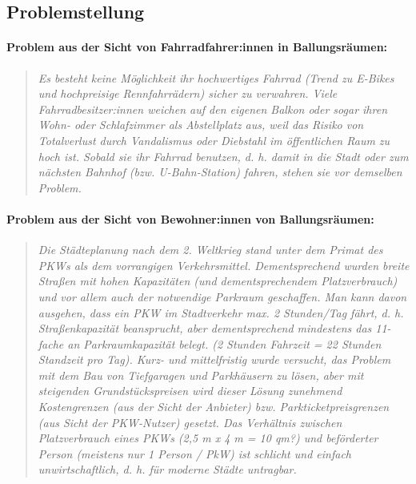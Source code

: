 \subsection{Problemstellung}

\paragraph{Problem aus der Sicht von Fahrradfahrer:innen in Ballungsräumen:}
\begin{quote}
  \textit{
    Es besteht keine Möglichkeit ihr hochwertiges Fahrrad (Trend zu E-Bikes und hochpreisige Rennfahrrädern) sicher zu verwahren. Viele Fahrradbesitzer:innen weichen auf den eigenen Balkon oder sogar ihren Wohn- oder Schlafzimmer als Abstellplatz aus, weil das Risiko von Totalverlust durch Vandalismus oder Diebstahl im öffentlichen Raum zu hoch ist. Sobald sie ihr Fahrrad benutzen, d. h. damit in die Stadt oder zum nächsten Bahnhof (bzw. U-Bahn-Station) fahren, stehen sie vor demselben Problem.
  }
\end{quote}


\paragraph{Problem aus der Sicht von Bewohner:innen von Ballungsräumen:}
\begin{quote}
  \textit{
    Die Städteplanung nach dem 2. Weltkrieg stand unter dem Primat des PKWs als dem vorrangigen Verkehrsmittel. Dementsprechend wurden breite Straßen mit hohen Kapazitäten (und dementsprechendem Platzverbrauch) und vor allem auch der notwendige Parkraum geschaffen. Man kann davon ausgehen, dass ein PKW im Stadtverkehr max. 2 Stunden/Tag fährt, d. h. Straßenkapazität beansprucht, aber dementsprechend mindestens das 11-fache an Parkraumkapazität belegt. (2 Stunden Fahrzeit = 22 Stunden Standzeit pro Tag). Kurz- und mittelfristig wurde versucht, das Problem mit dem Bau von Tiefgaragen und Parkhäusern zu lösen, aber mit steigenden Grundstückspreisen wird dieser Lösung zunehmend Kostengrenzen (aus der Sicht der Anbieter) bzw. Parkticketpreisgrenzen (aus Sicht der PKW-Nutzer) gesetzt. Das Verhältnis zwischen Platzverbrauch eines PKWs (2,5 m x 4 m = 10 qm?) und beförderter Person (meistens nur 1 Person / PkW) ist schlicht und einfach unwirtschaftlich, d. h. für moderne Städte untragbar.
  }
\end{quote}
